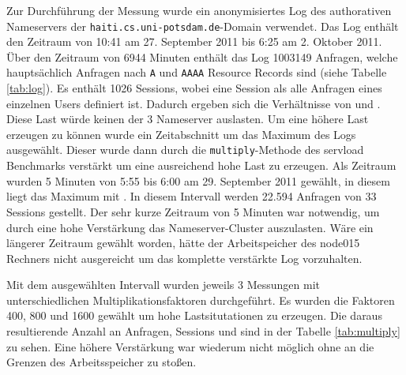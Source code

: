 \documentclass[a4paper, 12pt, BCOR10mm, DIV12, toc=bibliography, toc=listof, german]{scrbook}
\begin{document}
		Zur Durchführung der  Messung wurde ein anonymisiertes Log des authorativen Nameservers der
		\texttt{haiti.cs.uni-potsdam.de}-Domain verwendet. Das Log enthält den Zeitraum von 10:41 am 27.
		September 2011 bis 6:25 am 2. Oktober 2011. Über den Zeitraum von 6944 Minuten enthält das Log
		1003149 Anfragen, welche hauptsächlich Anfragen nach \texttt{A} und \texttt{AAAA} Resource
		Records sind (siehe Tabelle \ref{tab:log}). Es enthält 1026 Sessions, wobei eine Session als
		alle Anfragen eines einzelnen Users definiert ist. Dadurch ergeben sich die Verhältnisse von
		\unit[9,33]{} und \unit[977,63]{}. Diese
		Last würde keinen der 3 Nameserver auslasten. Um eine höhere Last erzeugen zu können wurde ein
		Zeitabschnitt um das Maximum des Logs ausgewählt. Dieser wurde dann durch die
		\texttt{multiply}-Methode des servload Benchmarks verstärkt um eine ausreichend hohe Last zu
		erzeugen. Als Zeitraum wurden 5 Minuten von 5:55 bis 6:00 am 29. September 2011 gewählt, in
		diesem liegt das Maximum mit \unit[204]{}. In diesem Intervall
		werden 22.594 Anfragen von 33 Sessions gestellt. Der sehr kurze Zeitraum von 5 Minuten war
		notwendig, um durch eine hohe Verstärkung das Nameserver-Cluster auszulasten. Wäre ein
		längerer Zeitraum gewählt worden, hätte der Arbeitspeicher des node015 Rechners nicht
		ausgereicht um das komplette verstärkte Log vorzuhalten.
		
		Mit dem ausgewählten Intervall wurden jeweils 3 Messungen mit unterschiedlichen
		Multiplikationsfaktoren durchgeführt. Es wurden die Faktoren 400, 800 und 1600 gewählt um hohe
		Lastsitutationen zu erzeugen. Die daraus resultierende Anzahl an Anfragen, Sessions und
		 sind in der Tabelle \ref{tab:multiply} zu sehen. Eine höhere
		Verstärkung war wiederum nicht möglich ohne an die Grenzen des Arbeitsspeicher zu stoßen.
\end{document}
